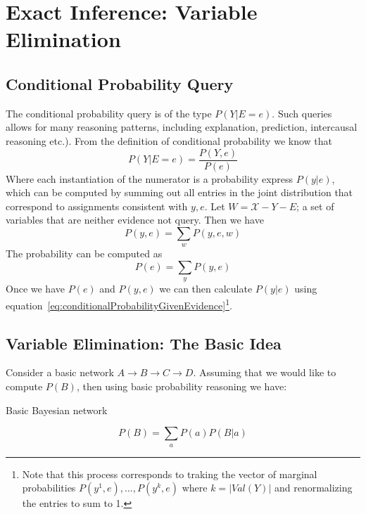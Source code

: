 \section{Exact Inference: Variable Elimination}\label{sec:exactInferenceVariableElimination}

\subsection{Conditional Probability Query}\label{sec:conditionalProbabilityQuery}
The conditional probability query is of the type $P(Y | E=e)$.  Such queries allows for many reasoning patterns, including explanation, prediction, intercausal reasoning etc.).  From the definition of conditional probability we know that
\begin{equation}\label{eq:conditionalProbabilityGivenEvidence}P(Y|E=e) = \frac{P(Y,e)}{P(e)}\end{equation}
Where each instantiation of the numerator is a probability express $P(y|e)$, which can be computed by summing out all entries in the joint distribution that correspond to assignments consistent with $y,e$.  Let $W = \mathcal{X} - Y - E$; a set of variables that are neither evidence not query.  Then we have
\begin{equation}P(y,e)=\sum_w P(y,e,w)\end{equation}
The probability can be computed as \begin{equation}P(e)=\sum_y P(y,e)\end{equation}
Once we have $P(e)$ and $P(y,e)$ we can then calculate $P(y|e)$ using equation~\ref{eq:conditionalProbabilityGivenEvidence}\footnote{Note that this process corresponds to traking the vector of marginal probabilities $P(y^1,e),\ldots,P(y^k,e)$ where $k=|Val(Y)|$ and renormalizing the entries to sum to 1. }.


\subsection{Variable Elimination: The Basic Idea}\label{sec:variableEliminationBasicIdea}
Consider a basic network $A \rightarrow B \rightarrow C \rightarrow D$.  Assuming that we would like to compute $P(B)$, then using basic probability reasoning we have:
\begin{marginfigure}\label{fig:basicMarkovNetwork}
\bayesianABCD
\caption{Basic Bayesian network}
\end{marginfigure}
\begin{equation}P(B) = \sum_a P(a)P(B|a)\end{equation}

